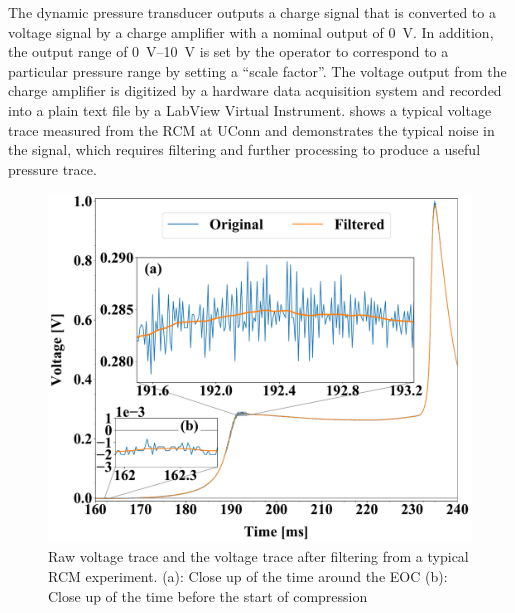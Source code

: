 \documentclass[12pt]{../ussci}
\begin{document}
The dynamic pressure transducer outputs a charge signal that is converted to a
voltage signal by a charge amplifier with a nominal output of \SI{0}{\V}. In
addition, the output range of \SIrange{0}{10}{\V} is set by the operator to
correspond to a particular pressure range by setting a ``scale factor''. The
voltage output from the charge amplifier is digitized by a hardware data
acquisition system and recorded into a plain text file by a LabView
Virtual Instrument.  shows a typical voltage trace
measured from the RCM at UConn and demonstrates the typical noise in the signal,
which requires filtering and further processing to produce a useful pressure
trace.

\begin{figure}[htbp]
    \begin{minipage}[t]{0.48\textwidth}
        \centering
        \includegraphics[width=\linewidth]{figures/raw-voltage.pdf}
        \caption{Raw voltage trace and the voltage trace after filtering from a typical
        RCM experiment. (a): Close up of the
        time around the EOC (b): Close up of the time before the start of
        compression}
        \label{fig:raw-voltage}
    \end{minipage}\hfill%
    \begin{minipage}[t]{0.48\textwidth}
        \centering

\end{minipage}
\end{figure}
\end{document}
